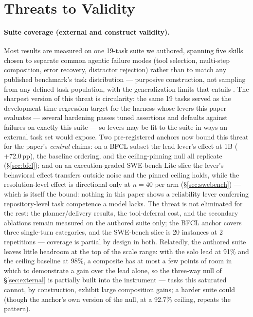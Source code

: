 \documentclass[smallcondensed,natbib]{svjour3}
\begin{document}
\section{Threats to Validity}\label{sec:threats}

\paragraph{Suite coverage (external and construct validity).} Most
results are measured on one 19-task suite we authored, spanning five
skills chosen to separate common agentic failure modes (tool
selection, multi-step composition, error recovery, distractor
rejection) rather than to match any published benchmark's task
distribution --- purposive construction, not sampling from any defined
task population, with the generalization limits that entails
\citep{baltes2022sampling}. The sharpest version of this threat is circularity: the
same 19 tasks served as the development-time regression target for the
harness whose levers this paper evaluates --- several hardening passes
tuned assertions and defaults against failures on exactly this suite
--- so levers may be fit to the suite in ways an external task set
would expose. Two pre-registered anchors now bound this threat for
the paper's \emph{central} claims: on a BFCL subset the lead lever's
effect at 1B ($+72.0$\,pp), the baseline ordering, and the
ceiling-pinning null all replicate (\S\ref{sec:bfcl}); and on an
execution-graded SWE-bench Lite slice the lever's behavioral effect
transfers outside noise and the pinned ceiling holds, while the
resolution-level effect is directional only at $n{=}40$ per arm
(\S\ref{sec:swebench}) --- which is itself the bound: nothing in this
paper shows a reliability lever conferring repository-level task
competence a model lacks. The threat is not eliminated for the rest:
the planner/delivery results, the tool-deferral cost,
and the secondary ablations remain measured on the authored suite
only; the BFCL anchor covers three single-turn categories, and the
SWE-bench slice is 20 instances at 2 repetitions --- coverage is
partial by design in both. Relatedly, the authored suite leaves
little headroom at the top of the
scale range: with the solo lead at 91\% and the ceiling baseline at
98\%, a composite has at most a few points of room in which to
demonstrate a gain over the lead alone, so the three-way null of
\S\ref{sec:external} is partially built into the instrument --- tasks
this saturated cannot, by construction, exhibit large composition
gains; a harder suite could (though the anchor's own version of the
null, at a 92.7\% ceiling, repeats the pattern).
\end{document}
